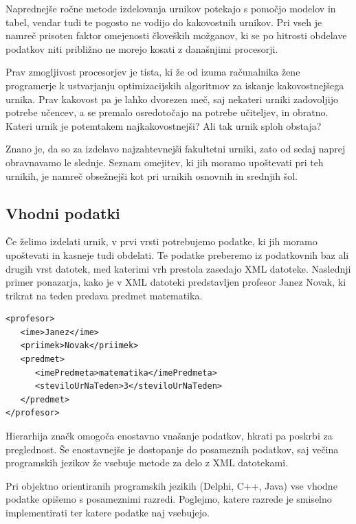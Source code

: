 \documentclass[a4paper,10pt]{article}
\begin{document}
Naprednejše ročne metode izdelovanja urnikov potekajo s pomočjo modelov in tabel, vendar
tudi te pogosto ne vodijo do kakovostnih urnikov. Pri vseh je namreč prisoten faktor
omejenosti človeških možganov, ki se po hitrosti obdelave podatkov niti približno ne
morejo kosati z današnjimi procesorji.

Prav zmogljivost procesorjev je tista, ki že od izuma računalnika žene programerje k
ustvarjanju optimizacijskih algoritmov za iskanje kakovostnejšega urnika. Prav kakovost
pa je lahko dvorezen meč, saj nekateri urniki zadovoljijo potrebe učencev, a se premalo
osredotočajo na potrebe učiteljev, in obratno. Kateri urnik je potemtakem najkakovostnejši?
Ali tak urnik sploh obstaja?

Znano je, da so za izdelavo najzahtevnejši fakultetni urniki, zato od sedaj naprej
obravnavamo le slednje. Seznam omejitev, ki jih moramo upoštevati pri teh urnikih,
je namreč obsežnejši kot pri urnikih osnovnih in srednjih šol.

\subsection{Vhodni podatki}

Če želimo izdelati urnik, v prvi vrsti potrebujemo podatke, ki jih moramo upoštevati in
kasneje tudi obdelati. Te podatke preberemo iz podatkovnih baz ali drugih vrst datotek,
med katerimi vrh prestola zasedajo XML datoteke. Naslednji primer ponazarja, kako je v
XML datoteki predstavljen profesor Janez Novak, ki trikrat na teden predava predmet
matematika.


\begin{verbatim}
<profesor>
   <ime>Janez</ime>
   <priimek>Novak</priimek>
   <predmet>
      <imePredmeta>matematika</imePredmeta>
      <steviloUrNaTeden>3</steviloUrNaTeden>
   </predmet>
</profesor>
\end{verbatim}
\noindent
Hierarhija značk omogoča enostavno vnašanje podatkov, hkrati pa poskrbi za preglednost.
Še enostavnejše je dostopanje do posameznih podatkov, saj večina programskih jezikov že
vsebuje metode za delo z XML datotekami.

Pri objektno orientiranih programskih jezikih (Delphi, C++, Java) vse vhodne podatke
opišemo s posameznimi razredi. Poglejmo, katere razrede je smiselno implementirati ter
katere podatke naj vsebujejo.
\end{document}
